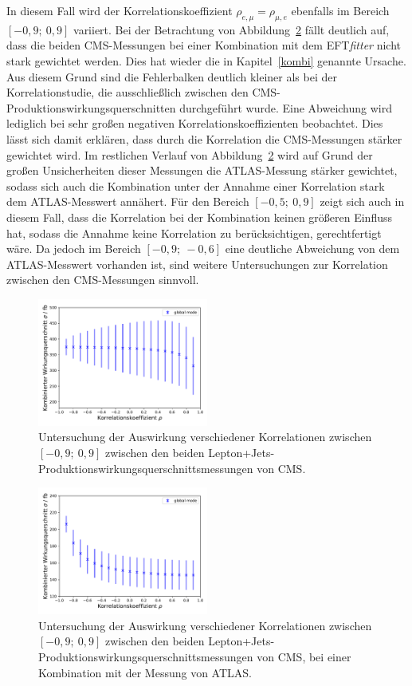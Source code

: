 In diesem Fall wird der Korrelationskoeffizient $\rho_{e, \mu}= \rho_{\mu, e}$ ebenfalls im Bereich $[-0,9;~0,9]$ variiert. Bei der Betrachtung von Abbildung~\ref{fig:corrca} fällt deutlich auf, dass die beiden CMS-Messungen bei einer Kombination mit dem EFT\textit{fitter} nicht stark gewichtet werden. Dies hat wieder die in Kapitel~\ref{kombi} genannte Ursache. Aus diesem Grund sind die Fehlerbalken deutlich kleiner als bei der Korrelationstudie, die ausschließlich zwischen den CMS-Produktionswirkungsquerschnitten durchgeführt wurde. Eine Abweichung wird lediglich bei sehr großen negativen Korrelationskoeffizienten beobachtet. Dies lässt sich damit erklären, dass durch die Korrelation die CMS-Messungen stärker gewichtet wird. Im restlichen Verlauf von Abbildung~\ref{fig:corrca} wird auf Grund der großen Unsicherheiten dieser Messungen die ATLAS-Messung stärker gewichtet, sodass sich auch die Kombination unter der Annahme einer Korrelation stark dem ATLAS-Messwert annähert. Für den Bereich $[-0,5;~0,9]$ zeigt sich auch in diesem Fall, dass die Korrelation bei der Kombination keinen größeren Einfluss hat, sodass die Annahme keine Korrelation zu berücksichtigen, gerechtfertigt wäre. Da jedoch im Bereich $[-0,9;~-0,6]$ eine deutliche Abweichung von dem ATLAS-Messwert vorhanden ist, sind weitere Untersuchungen zur Korrelation zwischen den CMS-Messungen sinnvoll.\\
\begin{figure}
  \centering
  \includegraphics[width=0.5\textwidth]{Plots/corr_CMS.pdf}
  \caption{Untersuchung der Auswirkung verschiedener Korrelationen zwischen $[-0,9;~0,9]$ zwischen den beiden Lepton+Jets-Produktionswirkungsquerschnittsmessungen von CMS.}
  \label{fig:corrcms}
\end{figure}
\begin{figure}
  \centering
  \includegraphics[width=0.5\textwidth]{Plots/fcorr_cms.pdf}
  \caption{Untersuchung der Auswirkung verschiedener Korrelationen zwischen $[-0,9;~0,9]$ zwischen den beiden Lepton+Jets-Produktionswirkungsquerschnittsmessungen von CMS, bei einer Kombination mit der Messung von ATLAS.}
  \label{fig:corrca}
\end{figure}

